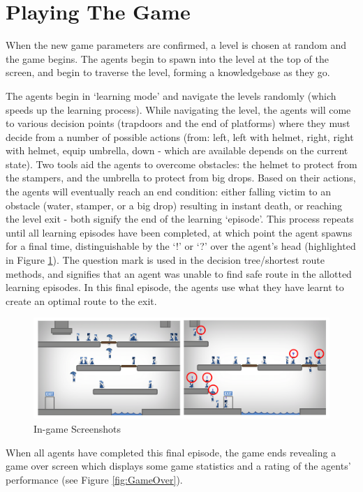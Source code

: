 \documentclass[a4paper,oneside]{report}
\begin{document}
\section{Playing The Game}

When the new game parameters are confirmed, a level is chosen at random and the game begins. The agents begin to spawn into the level at the top of the screen, and begin to traverse the level, forming a knowledgebase as they go. 

The agents begin in `learning mode' and navigate the levels randomly (which speeds up the learning process). While navigating the level, the agents will come to various decision points (trapdoors and the end of platforms) where they must decide from a number of possible actions (from: left, left with helmet, right, right with helmet, equip umbrella, down - which are available depends on the current state). Two tools aid the agents to overcome obstacles: the helmet to protect from the stampers, and the umbrella to protect from big drops. Based on their actions, the agents will eventually reach an end condition: either falling victim to an obstacle (water, stamper, or a big drop) resulting in instant death, or reaching the level exit - both signify the end of the learning `episode'. This process repeats until all learning episodes have been completed, at which point the agent spawns for a final time, distinguishable by the `!'  or `?' over the agent's head (highlighted in Figure \ref{fig:GameScreen}). The question mark is used in the decision tree/shortest route methods, and signifies that an agent was unable to find safe route in the allotted learning episodes. In this final episode, the agents use what they have learnt to create an optimal route to the exit.

\begin{figure}[H]
  \centering
    \includegraphics[width=130mm]{sources/images/Screen_Game}
    \caption{In-game Screenshots}
    \label{fig:GameScreen}
\end{figure}

When all agents have completed this final episode, the game ends revealing a game over screen which displays some game statistics and a rating of the agents' performance (see Figure \ref{fig:GameOver}).
\end{document}
